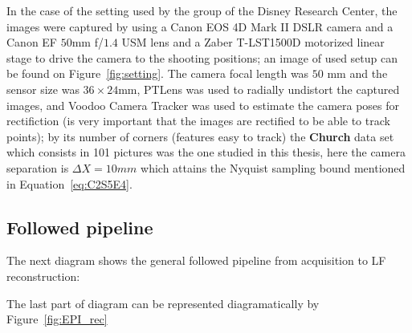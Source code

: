 \bigskip

In the case of the setting used by the group of the Disney Research Center, the images were captured by using a Canon EOS 4D Mark II DSLR camera and a Canon EF $50$mm f/$1.4$ USM lens and a Zaber T-LST1500D motorized linear stage to drive the camera to the shooting positions; an image of used setup can be found on Figure~\ref{fig:setting}. The camera focal length was $50$ mm and the sensor size was $36\times24$mm, PTLens was used to radially undistort the captured images, and Voodoo Camera Tracker was used to estimate the camera poses for rectifiction (is very important that the images are rectified to be able to track points); by its number of corners (features easy to track) the \textbf{Church} data set which consists in 101 pictures was the one studied in this thesis, here the camera separation is $\Delta X=10mm$ which attains the Nyquist sampling bound mentioned in Equation~\ref{eq:C2S5E4}.

\subsection{Followed pipeline}

The next diagram shows the general followed pipeline from acquisition to LF reconstruction:

\begin{center}
\end{center}

The last part of diagram can be represented diagramatically by Figure~\ref{fig:EPI_rec}

